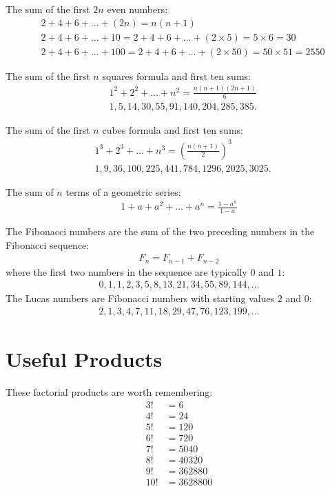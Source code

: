 \documentclass[12pt]{article}
\begin{document}
The sum of the first $2n$ even numbers:
\begin{align*}
& 2+4+6+\ldots+(2n) = n(n+1) \\
& 2+4+6+\ldots+10 = 2+4+6+\ldots+(2\times5) = 5 \times 6 = 30 \\
& 2+4+6+\ldots+100 = 2+4+6+\ldots+(2\times50) = 50\times51 = 2550
\end{align*}

The sum of the first $n$ squares formula and first ten sums:
\begin{align*}
& 1^2+2^2+\ldots+n^2 = \frac{n(n+1)(2n+1)}{6} \\
& 1, 5, 14, 30, 55, 91, 140, 204, 285, 385.
\end{align*}

The sum of the first $n$ cubes formula and first ten sums:
\begin{align*}
& 1^3+2^3+\ldots+n^3 = \left(\frac{n(n+1)}{2}\right)^{3} \\
& 1, 9, 36, 100, 225, 441, 784, 1296, 2025, 3025.
\end{align*}


The sum of $n$ terms of a geometric series:
\begin{align*}
1 + a + a^2 + \ldots + a^n
 = \frac{1-a^n}{1-a}
\end{align*}


The Fibonacci numbers are the sum of the two preceding numbers in the Fibonacci sequence:
\begin{align*}
F_{n} = F_{n-1} + F_{n-2}
\end{align*}
where the first two numbers in the sequence are typically $0$ and $1$:
\begin{align*}
0, 1 , 1, 2, 3, 5, 8, 13, 21, 34, 55, 89, 144, \ldots
\end{align*}
The Lucas numbers are Fibonacci numbers with starting values $2$ and $0$:
\begin{align*}
2, 1, 3, 4, 7, 11, 18, 29, 47, 76, 123, 199, \ldots
\end{align*}


\section*{Useful Products}
These factorial products are worth remembering:
\begin{align*}
 3! & = 6 \\
 4! & = 24 \\
 5! & = 120 \\
 6! & = 720 \\
 7! & = 5040 \\
 8! & = 40320 \\
 9! & = 362880 \\
10! & = 3628800 
\end{align*}
\end{document}
